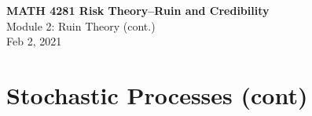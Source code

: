 \documentclass[11pt]{beamer}
\begin{document}
\begin{frame}
  \frametitle{}
  \begin{center}
    \textbf{\large MATH 4281 Risk Theory--Ruin and Credibility}\\
    \vspace{1cm}
    {\large  Module 2: Ruin Theory (cont.) } \\
    \vspace{1cm}
    {\large  Feb 2, 2021}
    \end{center}
    \vspace{1cm}
\end{frame}
\begin{frame}
\tableofcontents
\end{frame}
\section{Stochastic Processes (cont)}
\end{document}
